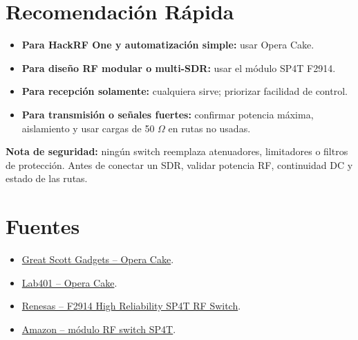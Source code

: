 \documentclass[11pt]{article}
\begin{document}
\section{Recomendación Rápida}

\begin{itemize}
    \item \textbf{Para HackRF One y automatización simple:} usar Opera Cake.
    \item \textbf{Para diseño RF modular o multi-SDR:} usar el módulo SP4T F2914.
    \item \textbf{Para recepción solamente:} cualquiera sirve; priorizar facilidad de control.
    \item \textbf{Para transmisión o señales fuertes:} confirmar potencia máxima, aislamiento y usar cargas de 50 $\Omega$ en rutas no usadas.
\end{itemize}

\begin{advertencia}
\textbf{Nota de seguridad:} ningún switch reemplaza atenuadores, limitadores o filtros de protección. Antes de conectar un SDR, validar potencia RF, continuidad DC y estado de las rutas.
\end{advertencia}

\section{Fuentes}

\begin{itemize}
    \item \href{https://greatscottgadgets.com/hackrf/operacake/}{Great Scott Gadgets -- Opera Cake}.
    \item \href{https://lab401.com/products/opera-cake-for-hackrf}{Lab401 -- Opera Cake}.
    \item \href{https://www.renesas.com/en/products/rf-products/rf-switches/f2914-high-reliability-sp4t-rf-switch}{Renesas -- F2914 High Reliability SP4T RF Switch}.
    \item \href{https://www.amazon.com/Switch-Module-Single-Impedance-Reliability/dp/B0BXVVLGFB}{Amazon -- módulo RF switch SP4T}.
\end{itemize}
\end{document}
